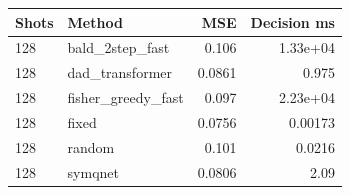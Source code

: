 \begin{tabular}{llrr}
\toprule
Shots & Method & MSE & Decision ms \\
\midrule
128 & bald\_2step\_fast & 0.106 & 1.33e+04 \\
128 & dad\_transformer & 0.0861 & 0.975 \\
128 & fisher\_greedy\_fast & 0.097 & 2.23e+04 \\
128 & fixed & 0.0756 & 0.00173 \\
128 & random & 0.101 & 0.0216 \\
128 & symqnet & 0.0806 & 2.09 \\
\bottomrule
\end{tabular}
